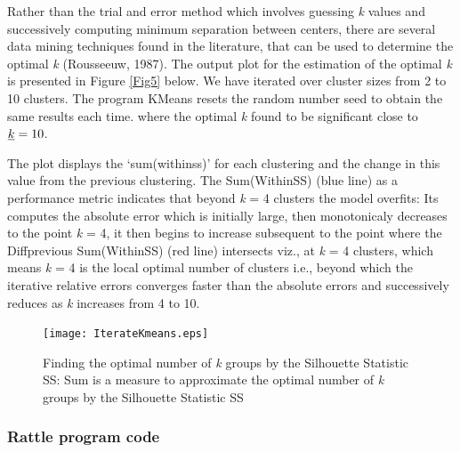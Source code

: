 \documentclass{DissertateUSU}
\begin{document}
Rather than the trial and error method which involves guessing \emph{k}
values and successively computing minimum separation between centers,
there are several data mining techniques found in the literature, that
can be used to determine the optimal \emph{k} (Rousseeuw, 1987). The
output plot for the estimation of the optimal \emph{k} is presented in
Figure \ref{Fig5} below. We have iterated over cluster sizes from 2 to
10 clusters. The program KMeans resets the random number seed to obtain
the same results each time. where the optimal \emph{k} found to be
significant close to \(\emph{k} = 10\).\medskip

The plot displays the `sum(withinss)' for each clustering and the change
in this value from the previous clustering. The Sum(WithinSS) (blue
line) as a performance metric indicates that beyond \emph{k} = 4
clusters the model overfits: Its computes the absolute error which is
initially large, then monotonicaly decreases to the point \emph{k} = 4,
it then begins to increase subsequent to the point where the
Diffprevious Sum(WithinSS) (red line) intersects viz., at \emph{k} = 4
clusters, which means \emph{k} = 4 is the local optimal number of
clusters i.e., beyond which the iterative relative errors converges
faster than the absolute errors and successively reduces as \emph{k}
increases from 4 to 10.

\begin{figure}
\centering
\texttt{[image: IterateKmeans.eps]}
\caption{Finding the optimal number of \emph{k} groups by the Silhouette Statistic SS: Sum is a  measure to approximate the optimal number of \emph{k} groups by the Silhouette Statistic SS}
\label{IterateKmeans}
\end{figure}

\subsubsection{Rattle program code}
\end{document}

